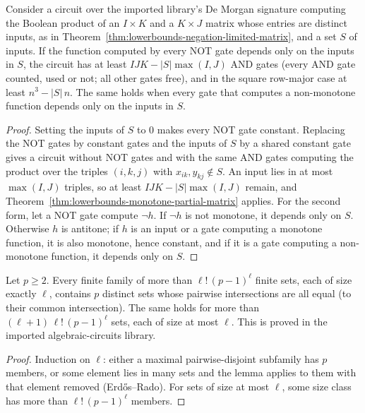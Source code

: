 \begin{theorem}
  \label{thm:lowerbounds-negation-local-matrix}
  \leanok
  Consider a circuit over the imported library's De Morgan signature computing
  the Boolean product of an $I \times K$ and a $K \times J$ matrix whose
  entries are distinct inputs, as in
  Theorem~\ref{thm:lowerbounds-negation-limited-matrix}, and a set $S$ of
  inputs. If the function computed by every NOT gate depends only on the
  inputs in $S$, the circuit has at least $IJK - |S| \max(I, J)$ AND gates
  (every AND gate counted, used or not; all other gates free), and in the
  square row-major case at least $n^3 - |S|\, n$. The same holds when every
  gate that computes a non-monotone function depends only on the inputs in
  $S$.
\end{theorem}
\begin{proof}
  \leanok
  Setting the inputs of $S$ to $0$ makes every NOT gate constant. Replacing
  the NOT gates by constant gates and the inputs of $S$ by a shared constant
  gate gives a circuit without NOT gates and with the same AND gates computing
  the product over the triples $(i, k, j)$ with $x_{ik}, y_{kj} \notin S$. An
  input lies in at most $\max(I, J)$ triples, so at least
  $IJK - |S| \max(I, J)$ remain, and
  Theorem~\ref{thm:lowerbounds-monotone-partial-matrix} applies. For the second
  form, let a NOT gate compute $\neg h$. If $\neg h$ is not monotone, it
  depends only on $S$. Otherwise $h$ is antitone; if $h$ is an input or a gate
  computing a monotone function, it is also monotone, hence constant, and if
  it is a gate computing a non-monotone function, it depends only on $S$.
\end{proof}

\begin{lemma}
  \label{lem:lowerbounds-sunflower}
  \leanok
  Let $p \ge 2$. Every finite family of more than $\ell!\,(p-1)^\ell$ finite
  sets, each of size exactly $\ell$, contains $p$ distinct sets whose pairwise
  intersections are all equal (to their common intersection). The same holds
  for more than $(\ell + 1)\,\ell!\,(p-1)^\ell$ sets, each of size at most
  $\ell$. This is proved in the imported algebraic-circuits library.
\end{lemma}
\begin{proof}
  \leanok
  Induction on $\ell$: either a maximal pairwise-disjoint subfamily has $p$
  members, or some element lies in many sets and the lemma applies to them
  with that element removed (Erd\H{o}s--Rado). For sets of size at most $\ell$,
  some size class has more than $\ell!\,(p-1)^\ell$ members.
\end{proof}

